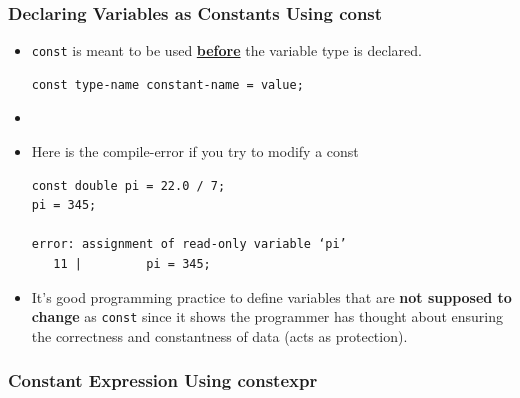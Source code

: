 \documentclass[10pt]{article}
\begin{document}
\subsubsection{Declaring Variables as Constants Using const}
\begin{itemize}
	\item \verb|const| is meant to be used \underline{\textbf{before}} the variable type is declared.

	\begin{verbatim}
const type-name constant-name = value;
	\end{verbatim}

	\item {}

	\item Here is the compile-error if you try to modify a const
	\begin{verbatim}
const double pi = 22.0 / 7;
pi = 345;

error: assignment of read-only variable ‘pi’
   11 |         pi = 345;
	\end{verbatim}

\item It's good programming practice to define variables that are \textbf{not supposed to change} as \verb|const| since it shows the programmer has thought about ensuring the correctness and constantness of data (acts as protection).
\end{itemize}

\newpage 

\subsubsection{Constant Expression Using constexpr}
\end{document}
